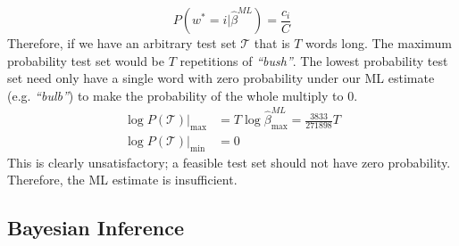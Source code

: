 \documentclass[]{article}
\newcommand{\betaml}{\hat{\beta}^{ML}}
\begin{document}
%
\begin{equation}
	P(w^* = i | \betaml) = \frac{c_i}{C}
	\label{eqn:ml-est}
\end{equation}
%
Therefore, if we have an arbitrary test set $\mathcal{T}$ that is $T$ words long. The maximum probability test set would be $T$ repetitions of \textit{``bush''}. The lowest probability test set need only have a single word with zero probability under our ML estimate (e.g. \textit{``bulb''}) to make the probability of the whole multiply to 0.
%
\begin{align}
	\log P(\mathcal{T}) |_{\max} &= T \log \betaml_{\max} = \frac{3833}{271898} T \\
	\log P(\mathcal{T}) |_{\min} &=  0
\end{align}
%
This is clearly unsatisfactory; a feasible test set should not have zero probability. Therefore, the ML estimate is insufficient.
 
\subsection{Bayesian Inference}
\end{document}
